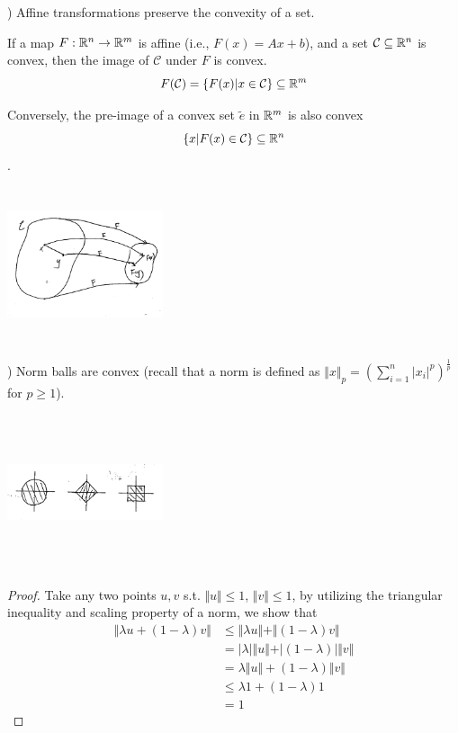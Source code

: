 ) Affine transformations preserve the convexity of a set.
	
If a map $F: \mathbb{R}^n \rightarrow \mathbb{R}^m$ is affine (i.e., $F(x) = Ax + b$), and a set $\mathcal{C} \subseteq \mathbb{R}^n$ is convex, then the image of $\mathcal{C}$ under $F$ is convex.
$$F(\mathcal{C}) = \{F(x) | x\in \mathcal{C} \} \subseteq \mathbb{R}^m$$

Conversely, the pre-image of a convex set $\tilde{e}$ in $\mathbb{R}^m$ is also convex
$$\{x|F(x)\in \mathcal{C} \} \subseteq \mathbb{R}^n$$.


\begin{marginfigure}
	\centering
	\includegraphics[width=1.8in,height=1.8in]{figures/ch08/figure1023_5.png}
\end{marginfigure}


) Norm balls are convex (recall that a norm is defined as $\Vert  x\Vert_p = (\sum^n_{i=1}\vert  x_i\vert^p)^{\frac{1}{p}}$ for $p\geq 1$).

\begin{marginfigure}
	\centering
	\includegraphics[width=1.8in,height=1.8in]{figures/ch08/figure1023_6.png}
\end{marginfigure}

\begin{proof}
	Take any two points $u,v$ s.t. $\Vert u\Vert \leq 1$, $\Vert v\Vert \leq 1$, by utilizing the triangular inequality and scaling property of a norm, we show that
	\begin{align*}
	\Vert \lambda u+(1-\lambda)v\Vert &\leq \Vert \lambda u\Vert + \Vert (1-\lambda)v\Vert\\
	&= \vert \lambda \vert \Vert  u\Vert + \vert (1-\lambda) \vert \Vert  v\Vert\\
	&= \lambda\Vert  u\Vert + (1-\lambda)\Vert  v\Vert\\
	&\leq \lambda 1 + (1-\lambda)1\\
	&= 1
	\end{align*}
\end{proof}

